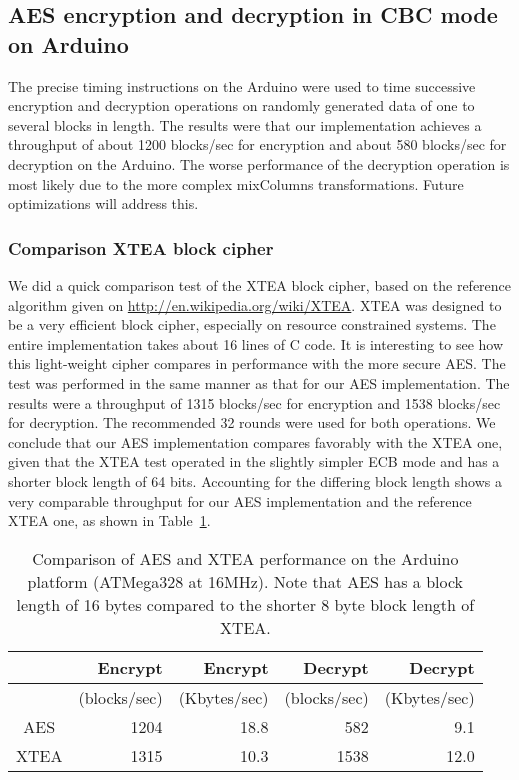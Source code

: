 \subsection{AES encryption and decryption in CBC mode on Arduino}

The precise timing instructions on the Arduino were used to time successive encryption and decryption operations on randomly generated data of one to several blocks in length. The results were that our implementation achieves a throughput of about 1200 blocks/sec for encryption and about 580 blocks/sec for decryption on the Arduino. The worse performance of the decryption operation is most likely due to the more complex mixColumns transformations. Future optimizations will address this.

\subsubsection*{Comparison XTEA block cipher}

We did a quick comparison test of the XTEA \cite{} block cipher, based on the reference algorithm given on \url{http://en.wikipedia.org/wiki/XTEA}. XTEA was designed to be a very efficient block cipher, especially on resource constrained systems. The entire implementation takes about 16 lines of C code. It is interesting to see how this light-weight cipher compares in performance with the more secure AES. The test was performed in the same manner as that for our AES implementation. The results were a throughput of 1315 blocks/sec for encryption and 1538 blocks/sec for decryption. The recommended 32 rounds were used for both operations. We conclude that our AES implementation compares favorably with the XTEA one, given that the XTEA test operated in the slightly simpler ECB mode and has a shorter block length of 64 bits. Accounting for the differing block length shows a very comparable throughput for our AES implementation and the reference XTEA one, as shown in Table~\ref{tab:aes-xtea-comparison}.

\begin{table}[h]
\begin{center}
\begin{tabular}{|c|r|r|r|r|}
\hline  & Encrypt & Encrypt & Decrypt & Decrypt \\
\hline  & (blocks/sec) & (Kbytes/sec) & (blocks/sec) & (Kbytes/sec) \\ 
\hline AES & 1204 & 18.8 & 582 & 9.1 \\ 
\hline XTEA & 1315 & 10.3 & 1538 & 12.0 \\ 
\hline 
\end{tabular}
\end{center}
\caption{Comparison of AES and XTEA performance on the Arduino platform (ATMega328 at 16MHz). Note that AES has a block length of 16 bytes compared to the shorter 8 byte block length of XTEA.}
\label{tab:aes-xtea-comparison}
\end{table} 

